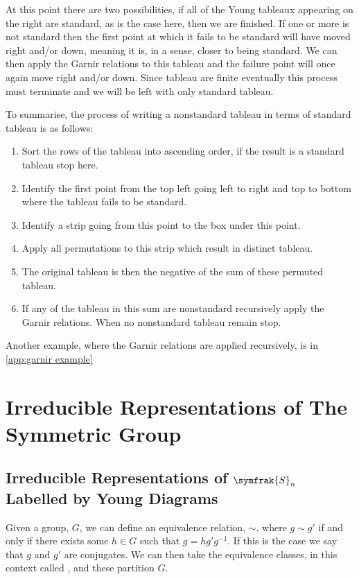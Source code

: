 \documentclass[fleqn]{NotesClass}
\newcommand{\symmetricGroup}[1][n]{\symfrak{S}_{#1}}
\begin{document}
    At this point there are two possibilities, if all of the Young tableaux appearing on the right are standard, as is the case here, then we are finished.
    If one or more is not standard then the first point at which it fails to be standard will have moved right and/or down, meaning it is, in a sense, closer to being standard.
    We can then apply the Garnir relations to this tableau and the failure point will once again move right and/or down.
    Since tableau are finite eventually this process must terminate and we will be left with only standard tableau.
    
    To summarise, the process of writing a nonstandard tableau in terms of standard tableau is as follows:
    \begin{enumerate}
        \item Sort the rows of the tableau into ascending order, if the result is a standard tableau stop here.
        \item Identify the first point from the top left going left to right and top to bottom where the tableau fails to be standard.
        \item Identify a strip going from this point to the box under this point.
        \item Apply all permutations to this strip which result in distinct tableau.
        \item The original tableau is then the negative of the sum of these permuted tableau.
        \item If any of the tableau in this sum are nonstandard recursively apply the Garnir relations.
        When no nonstandard tableau remain stop.
    \end{enumerate}
    Another example, where the Garnir relations are applied recursively, is in \cref{app:garnir example}
    
    \section{Irreducible Representations of The Symmetric Group}
    \subsection{Irreducible Representations of \texorpdfstring{\(\symmetricGroup\)}{Sn} Labelled by Young Diagrams}
    Given a group, \(G\), we can define an equivalence relation, \(\sim\), where \(g \sim g'\) if and only if there exists some \(h \in G\) such that \(g = hg'g^{-1}\).
    If this is the case we say that \(g\) and \(g'\) are conjugates.
    We can then take the equivalence classes, in this context called , and these partition \(G\).
    
\end{document}
